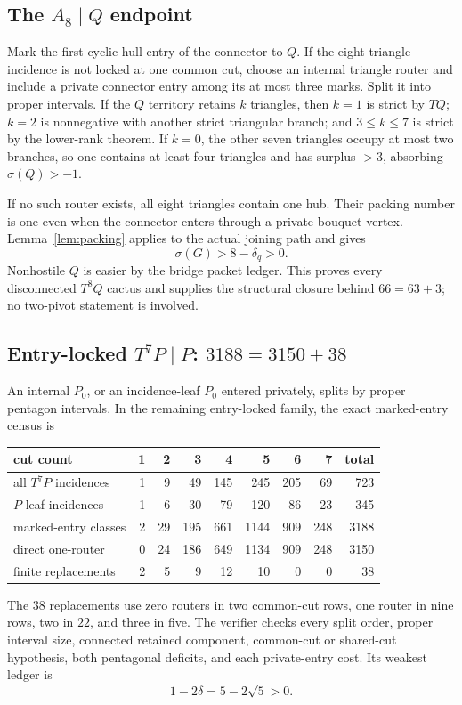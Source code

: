 \documentclass[11pt]{article}
\newcommand{\sig}{\sigma}
\begin{document}
\subsection{The \texorpdfstring{$A_8\mid Q$}{A8 | Q} endpoint}

Mark the first cyclic-hull entry of the connector to $Q$.  If the
eight-triangle incidence is not locked at one common cut, choose an internal
triangle router and include a private connector entry among its at most three
marks.  Split it into proper intervals.  If the $Q$ territory retains $k$
triangles, then $k=1$ is strict by $TQ$; $k=2$ is nonnegative with another
strict triangular branch; and $3\leq k\leq7$ is strict by the lower-rank
theorem.  If $k=0$, the other seven triangles occupy at most two branches, so
one contains at least four triangles and has surplus $>3$, absorbing
$\sig(Q)>-1$.

If no such router exists, all eight triangles contain one hub.  Their packing
number is one even when the connector enters through a private bouquet vertex.
Lemma~\ref{lem:packing} applies to the actual joining path and gives
\[
 \sig(G)>8-\delta_q>0.
\]
Nonhostile $Q$ is easier by the bridge packet ledger.  This proves every
disconnected $T^8Q$ cactus and supplies the structural closure behind
$66=63+3$; no two-pivot statement is involved.

\subsection{Entry-locked \texorpdfstring{$T^7P\mid P$}{T7P | P}:
\texorpdfstring{$3188=3150+38$}{3188 = 3150 + 38}}

An internal $P_0$, or an incidence-leaf $P_0$ entered privately, splits by
proper pentagon intervals.  In the remaining entry-locked family, the exact
marked-entry census is
\begin{center}
\begin{tabular}{lrrrrrrrr}
\toprule
cut count&1&2&3&4&5&6&7&total\\
\midrule
all $T^7P$ incidences&1&9&49&145&245&205&69&723\\
$P$-leaf incidences&1&6&30&79&120&86&23&345\\
marked-entry classes&2&29&195&661&1144&909&248&3188\\
direct one-router&0&24&186&649&1134&909&248&3150\\
finite replacements&2&5&9&12&10&0&0&38\\
\bottomrule
\end{tabular}
\end{center}
The $38$ replacements use zero routers in two common-cut rows, one router in
nine rows, two in $22$, and three in five.  The verifier checks every split
order, proper interval size, connected retained component, common-cut or
shared-cut hypothesis, both pentagonal deficits, and each private-entry cost.
Its weakest ledger is
\begin{equation}\label{eq:weak}
 1-2\delta=5-2\sqrt5>0.
\end{equation}
\end{document}
